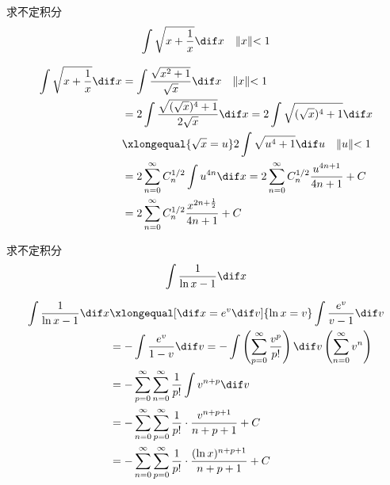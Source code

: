 \documentclass[color=green,titlestyle=hang]{elegantbook}%
\begin{document}
\begin{exercise}求不定积分\[\int\sqrt{x+\frac{1}{x}}\dif x\quad \lVert x\lVert<1\]
\end{exercise}\begin{Solution}
\begin{align*}
\int\sqrt{x+\frac{1}{x}}\dif x&=\int\frac{\sqrt{x^2+1}}{\sqrt x}\dif x\quad \lVert x\lVert<1\\
&=2\int\frac{\sqrt{(\sqrt{x})^4+1}}{2\sqrt{x}}\dif x=2\int\sqrt{(\sqrt{x})^4+1}\dif x\\
&\xlongequal{\sqrt{x}=u}2\int\sqrt{u^4+1}\dif u\quad \lVert u\lVert<1\\
&=2\sum_{n=0}^{\infty}C_n^{1/2}\int u^{4n}\dif x=2\sum_{n=0}^{\infty}C_n^{1/2}\frac{u^{4n+1}}{4n+1}+C\\
&=2\sum_{n=0}^{\infty}C_n^{1/2}\frac{x^{2n+\frac{1}{2}}}{4n+1}+C
\end{align*}
\end{Solution}

\begin{example}
求不定积分\[\int\frac{1}{\ln x-1}\dif x\]
\end{example}\begin{Solution}
\begin{align*}
\int\frac{1}{\ln x-1}\dif x&\xlongequal[\dif x=e^v\dif v]{\ln x=v}\int\frac{e^v}{v-1}\dif v\\
&=-\int\frac{e^v}{1-v}\dif v=-\int\left(\sum_{p=0}^{\infty}\frac{v^p}{p!}\right)\dif v
\left(\sum_{n=0}^{\infty}v^n\right)\\
&=-\sum_{p=0}^{\infty}\sum_{n=0}^{\infty}\frac{1}{p!}\int v^{n+p}\dif v\\
&=-\sum_{n=0}^{\infty}\sum_{p=0}^{\infty}\frac{1}{p!}\cdot\frac{v^{n+p+1}}{n+p+1}+C\\
&=-\sum_{n=0}^{\infty}\sum_{p=0}^{\infty}\frac{1}{p!}\cdot\frac{(\ln x)^{n+p+1}}{n+p+1}+C
\end{align*}
\end{Solution}
\end{document}
